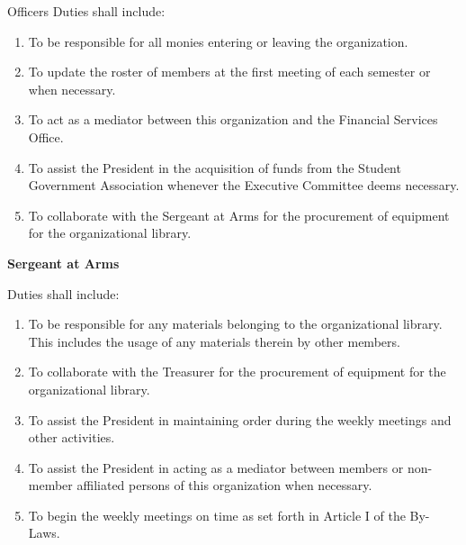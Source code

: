 {\begin{article}{Officers}
		Duties shall include:
		\begin{enumerate}
			\item To be responsible for all monies entering or leaving the organization.
			\item To update the roster of members at the first meeting of each semester or when necessary.
			\item To act as a mediator between this organization and the Financial Services Office.
			\item To assist the President in the acquisition of funds from the Student Government Association whenever the Executive Committee deems necessary.
			\item To collaborate with the Sergeant at Arms for the procurement of equipment for the organizational library.
		\end{enumerate}
		\item \textbf{Sergeant at Arms}
		
		Duties shall include:
		\begin{enumerate}
			\item To be responsible for any materials belonging to the organizational library. This includes the usage of any materials therein by other members.
			\item To collaborate with the Treasurer for the procurement of equipment for the organizational library.
			\item To assist the President in maintaining order during the weekly meetings and other activities.
			\item To assist the President in acting as a mediator between members or non-member affiliated persons of this organization when necessary.
			\item To begin the weekly meetings on time as set forth in Article I of the By-Laws.
		\end{enumerate}
	\end{article}
}